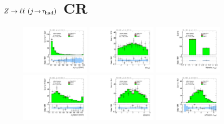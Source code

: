 \clearpage

\section{$Z \rightarrow \ell\ell \ (j\!\rightarrow\!\tau_\text{had})$ CR}

\begin{figure}[!htpb]
  \centering
  \includegraphics[width=0.30\textwidth]{figures/analysis/vbf-ZllCR/tau-pt}
  \includegraphics[width=0.30\textwidth]{figures/analysis/vbf-ZllCR/tau-eta}
  \includegraphics[width=0.30\textwidth]{figures/analysis/vbf-ZllCR/tau-numTrack} \\
  \includegraphics[width=0.30\textwidth]{figures/analysis/vbf-ZllCR/lep-pt-hi}
  \includegraphics[width=0.30\textwidth]{figures/analysis/vbf-ZllCR/lep-eta}
  \includegraphics[width=0.30\textwidth]{figures/analysis/vbf-ZllCR/taulep-dR} \\

\end{figure}
